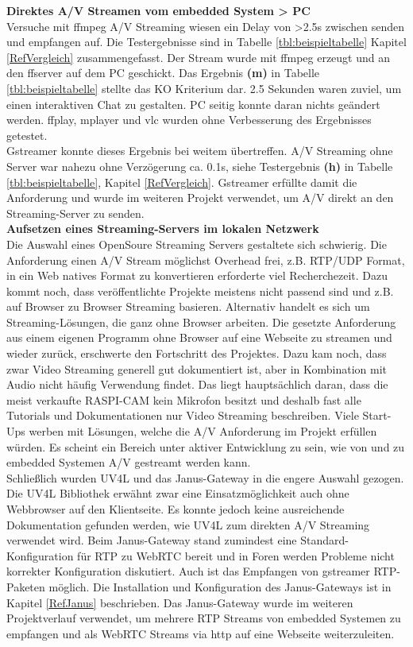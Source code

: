 \textbf{Direktes A/V Streamen vom embedded System > PC}\\
Versuche mit ffmpeg A/V Streaming wiesen ein Delay von >2.5s zwischen senden und empfangen auf. Die Testergebnisse sind in Tabelle \ref{tbl:beispieltabelle} Kapitel \ref{RefVergleich} zusammengefasst. Der Stream wurde mit ffmpeg erzeugt und an den ffserver auf dem PC geschickt. Das Ergebnis \textbf{(m)} in Tabelle \ref{tbl:beispieltabelle} stellte das KO Kriterium dar. 2.5 Sekunden waren zuviel, um einen interaktiven Chat zu gestalten. PC seitig konnte daran nichts geändert werden. ffplay, mplayer und vlc wurden ohne Verbesserung des Ergebnisses getestet.\\
Gstreamer konnte dieses Ergebnis bei weitem übertreffen. A/V Streaming ohne Server war nahezu ohne Verzögerung ca. 0.1s, siehe Testergebnis \textbf{(h)} in Tabelle \ref{tbl:beispieltabelle}, Kapitel \ref{RefVergleich}. Gstreamer erfüllte damit die Anforderung und wurde im weiteren Projekt verwendet, um A/V direkt an den Streaming-Server zu senden.\\

\textbf{Aufsetzen eines Streaming-Servers im lokalen Netzwerk}\\
Die Auswahl eines OpenSoure Streaming Servers gestaltete sich schwierig. Die Anforderung einen A/V Stream möglichst Overhead frei, z.B. RTP/UDP Format, in ein Web natives Format zu konvertieren erforderte viel Recherchezeit. Dazu kommt noch, dass veröffentlichte Projekte meistens nicht passend sind und z.B. auf Browser zu Browser Streaming basieren. Alternativ handelt es sich um Streaming-Lösungen, die ganz ohne Browser arbeiten. Die gesetzte Anforderung aus einem eigenen Programm ohne Browser auf eine Webseite zu streamen und wieder zurück, erschwerte den Fortschritt des Projektes. Dazu kam noch, dass zwar Video Streaming generell gut dokumentiert ist, aber in Kombination mit Audio nicht häufig Verwendung findet. Das liegt hauptsächlich daran, dass die meist verkaufte RASPI-CAM kein Mikrofon besitzt und deshalb fast alle Tutorials und Dokumentationen nur Video Streaming beschreiben. Viele Start-Ups werben mit Lösungen, welche die A/V Anforderung im Projekt erfüllen würden. Es scheint ein Bereich unter aktiver Entwicklung zu sein, wie von und zu embedded Systemen A/V gestreamt werden kann.\\
Schließlich wurden UV4L und das Janus-Gateway in die engere Auswahl gezogen. Die UV4L Bibliothek erwähnt zwar eine Einsatzmöglichkeit auch ohne Webbrowser auf den Klientseite. Es konnte jedoch keine ausreichende Dokumentation gefunden werden, wie UV4L zum direkten A/V Streaming verwendet wird. Beim Janus-Gateway stand zumindest eine Standard-Konfiguration für RTP zu WebRTC bereit und in Foren werden Probleme nicht korrekter Konfiguration diskutiert. Auch ist das Empfangen von gstreamer RTP-Paketen möglich. Die Installation und Konfiguration des Janus-Gateways ist in Kapitel \ref{RefJanus} beschrieben. Das Janus-Gateway wurde im weiteren Projektverlauf verwendet, um mehrere RTP Streams von embedded Systemen zu empfangen und als WebRTC Streams via http auf eine Webseite weiterzuleiten.\\

